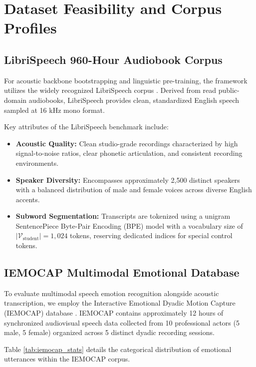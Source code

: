 \section{Dataset Feasibility and Corpus Profiles}

\subsection{LibriSpeech 960-Hour Audiobook Corpus}
For acoustic backbone bootstrapping and linguistic pre-training, the framework utilizes the widely recognized LibriSpeech corpus \cite{panayotov2015librispeech}. Derived from read public-domain audiobooks, LibriSpeech provides clean, standardized English speech sampled at 16 kHz mono format. 

Key attributes of the LibriSpeech benchmark include:
\begin{itemize}
    \item \textbf{Acoustic Quality:} Clean studio-grade recordings characterized by high signal-to-noise ratios, clear phonetic articulation, and consistent recording environments.
    \item \textbf{Speaker Diversity:} Encompasses approximately 2,500 distinct speakers with a balanced distribution of male and female voices across diverse English accents.
    \item \textbf{Subword Segmentation:} Transcripts are tokenized using a unigram SentencePiece Byte-Pair Encoding (BPE) model with a vocabulary size of $|\mathcal{V}_{\text{student}}| = 1{,}024$ tokens, reserving dedicated indices for special control tokens.
\end{itemize}

\subsection{IEMOCAP Multimodal Emotional Database}
To evaluate multimodal speech emotion recognition alongside acoustic transcription, we employ the Interactive Emotional Dyadic Motion Capture (IEMOCAP) database \cite{busso2008iemocap}. IEMOCAP contains approximately 12 hours of synchronized audiovisual speech data collected from 10 professional actors (5 male, 5 female) organized across 5 distinct dyadic recording sessions.

Table \ref{tab:iemocap_stats} details the categorical distribution of emotional utterances within the IEMOCAP corpus.

